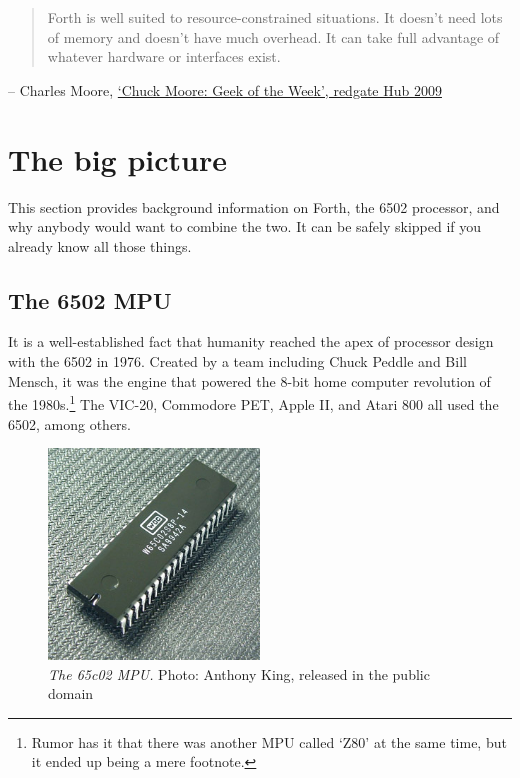 
\begin{quote}
        Forth is well suited to resource-constrained situations. It doesn't need
        lots of memory and doesn't have much overhead. It can take full
        advantage of whatever hardware or interfaces exist.
\end{quote}
\begin{flushright}
        -- Charles Moore, 
        \href{https://www.red-gate.com/simple-talk/opinion/geek-of-the-week/chuck-moore-geek-of-the-week/}{`Chuck
        Moore: Geek of the Week', redgate Hub 2009}
\end{flushright}

\section{The big picture}

This section provides background information on Forth, the 6502 processor, and
why anybody would want to combine the two. It can be safely skipped if you
already know all those things.

\subsection{The 6502 MPU}

It is a well-established fact that humanity reached the apex of processor design
with the 6502 in 1976. Created by a team including Chuck
Peddle and Bill Mensch, it was the
engine that powered the 8-bit home computer revolution of the
1980s.\footnote{Rumor has it that there was another MPU called `Z80'
at the same time, but it ended up being a mere footnote.} The
VIC-20, Commodore PET, Apple II, and Atari 800 all used the 6502, among others. 

\begin{figure}[h !]
        \centering
        \includegraphics[width=0.5\textwidth]{pics/W65c02}
        \caption{\textit{The 65c02 MPU.} Photo: Anthony King, released in 
        the public domain}
        \label{fig:65c02}
\end{figure}

